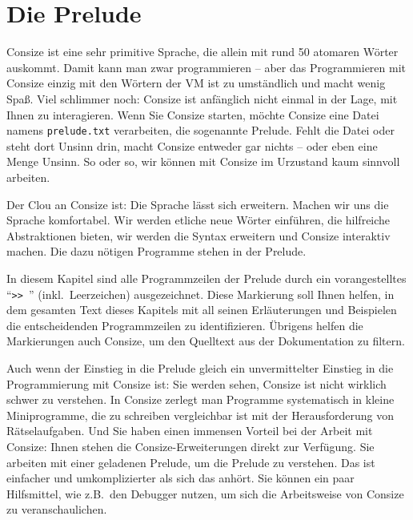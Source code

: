 \chapter{Die Prelude}
\label{Sec:Prelude}

Consize ist eine sehr primitive Sprache, die allein mit rund 50 atomaren Wörter auskommt. Damit kann man zwar programmieren -- aber das Programmieren mit Consize einzig mit den Wörtern der VM ist zu umständlich und macht wenig Spaß. Viel schlimmer noch: Consize ist anfänglich nicht einmal in der Lage, mit Ihnen zu interagieren. Wenn Sie Consize starten, möchte Consize eine Datei namens \verb|prelude.txt| verarbeiten, die sogenannte Prelude. Fehlt die Datei oder steht dort Unsinn drin, macht Consize entweder gar nichts -- oder eben eine Menge Unsinn. So oder so, wir können mit Consize im Urzustand kaum sinnvoll arbeiten.

Der Clou an Consize ist: Die Sprache lässt sich erweitern. Machen wir uns die Sprache komfortabel. Wir werden etliche neue Wörter einführen, die hilfreiche Abstraktionen bieten, wir werden die Syntax erweitern und Consize interaktiv machen. Die dazu nötigen Programme stehen in der Prelude.

In diesem Kapitel sind alle Programmzeilen der Prelude durch ein vorangestelltes "`\verb|>> |"' (inkl.\ Leerzeichen) ausgezeichnet. Diese Markierung soll Ihnen helfen, in dem gesamten Text dieses Kapitels mit all seinen Erläuterungen und Beispielen die entscheidenden Programmzeilen zu identifizieren. Übrigens helfen die Markierungen auch Consize, um den Quelltext aus der Dokumentation zu filtern.

Auch wenn der Einstieg in die Prelude gleich ein unvermittelter Einstieg in die Programmierung mit Consize ist: Sie werden sehen, Consize ist nicht wirklich schwer zu verstehen. In Consize zerlegt man Programme systematisch in kleine Miniprogramme, die zu schreiben vergleichbar ist mit der Herausforderung von Rätselaufgaben. Und Sie haben einen immensen Vorteil bei der Arbeit mit Consize: Ihnen stehen die Consize-Erweiterungen direkt zur Verfügung. Sie arbeiten mit einer geladenen Prelude, um die Prelude zu verstehen. Das ist einfacher und umkomplizierter als sich das anhört. Sie können ein paar Hilfsmittel, wie z.B.\ den Debugger nutzen, um sich die Arbeitsweise von Consize zu veranschaulichen.


